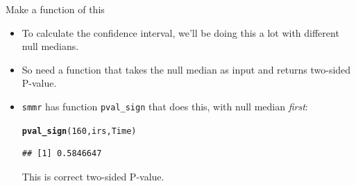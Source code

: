 \documentclass[unknownkeysallowed]{beamer}\usepackage[]{graphicx}\usepackage[]{color}
\makeatletter
\newcommand{\hlnum}[1]{\textcolor[rgb]{0.686,0.059,0.569}{#1}}%
\newcommand{\hlstd}[1]{\textcolor[rgb]{0.345,0.345,0.345}{#1}}%
\newcommand{\hlkwd}[1]{\textcolor[rgb]{0.737,0.353,0.396}{\textbf{#1}}}%
\newenvironment{kframe}{%
 \def\at@end@of@kframe{}%
 \ifinner\ifhmode%
  \def\at@end@of@kframe{\end{minipage}}%
  \begin{minipage}{\columnwidth}%
 \fi\fi%
 \def\FrameCommand##1{\hskip\@totalleftmargin \hskip-\fboxsep
 \colorbox{shadecolor}{##1}\hskip-\fboxsep
     \hskip-\linewidth \hskip-\@totalleftmargin \hskip\columnwidth}%
 \MakeFramed {\advance\hsize-\width
   \@totalleftmargin\z@ \linewidth\hsize
   \@setminipage}}%
 {\par\unskip\endMakeFramed%
 \at@end@of@kframe}
\newenvironment{knitrout}{}{} %
\makeatother
\begin{document}
\begin{frame}[fragile]{Make a function of this}
  
  \begin{itemize}
  \item To calculate the confidence interval, we'll be doing this a
    lot with different null medians.
  \item So need a function that takes the null median as input
    and returns two-sided P-value.
  \item \texttt{smmr} has function \texttt{pval\_sign} that does this,
    with null median \emph{first}:
    
\begin{knitrout}
\color{fgcolor}\begin{kframe}
\begin{alltt}
\hlkwd{pval_sign}\hlstd{(}\hlnum{160}\hlstd{,irs,Time)}
\end{alltt}
\begin{verbatim}
## [1] 0.5846647
\end{verbatim}
\end{kframe}
\end{knitrout}

This is correct two-sided P-value.

  \end{itemize}
  
\end{frame}
\end{document}
